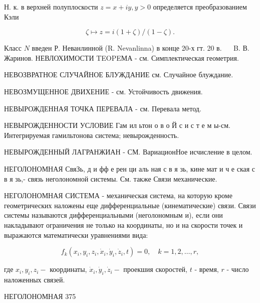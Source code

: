 \documentclass[10pt]{article}
\begin{document}
Н. к. в верхней полуплоскости $z=x+i y, y>0$ определяется преобразованием Кэли



\[

\zeta \mapsto z=i(1+\zeta) /(1-\zeta) .

\]



Класс $N$ введен Р. Неванлинной (R. Nevanlinna) в конце 20-х гт. 20 в. $\quad$ B. В. Жаринов. НЕВЛОХИМОСТИ TEOPEМА - см. Симплектическая геометрия.



НЕВОЗВРАТНОЕ СЛУЧАЙНОЕ БЛУЖДАНИЕ см. Случайное блуждание.



НЕВОЗМУЩЕННОЕ ДВИХЕНИЕ - см. Устойчивость движения.



НЕВЫРОЖДЕННАЯ ТОЧКА ПЕРЕВАЛА - см. Перевала метод.



НЕВЫРОЖДЕННОСТИ УСЛОВИЕ Гам ил ьтон о в о Й с и с т е м ы-см. Интегрируемая гамильтонова система; невырожденность.



НЕВЫРОЖДЕННЫЙ ЛАГРАНЖИАН - СМ. ВариационНое исчисление в целом.



НЕГОЛОНОМНАЯ СвяЗь, д и фф е рен ци аль ная с в я зь, кине мат и ч е ская с в я зь,- связь неголономной системы. См. также Связи механические.



НЕГОЛОНОМНАЯ СИСТЕМА - механическая система, на которую кроме геометрических наложены еще дифференциальные (кинематические) связи. Связи системы называются дифференциальными (неголономным и), если они накладывают ограничения не только на координаты, но и на скорости точек и выражаются математически уравнениями вида:



\[

f_{k}\left(x_{i}, y_{i}, z_{i}, \dot{x}_{i}, \dot{y}_{i}, \dot{z}_{i}, t\right)=0, \quad k=1,2, \ldots, r,

\]



где $x_{i}, y_{i}, z_{i}-$ координаты, $\dot{x}_{i}, \dot{y}_{i}, \dot{z}_{i}-$ проекшия скоростей, $t$ - время, $r$ - число наложенных связей.



НЕГОЛОНОМНАЯ 375
\end{document}
